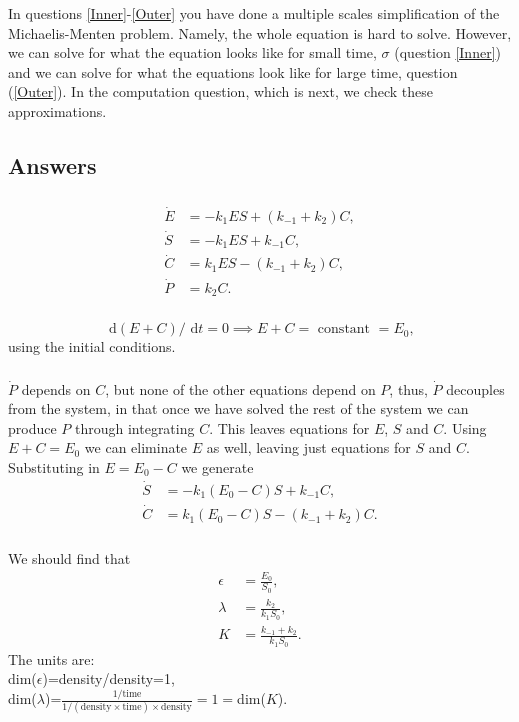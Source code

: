 \documentclass[]{article}
\newcommand{\bb}{\begin{equation}}
\newcommand{\ee}{\end{equation}}
\newcommand{\rd}{\text{ d}}
\renewcommand{\l}{\left(}
\renewcommand{\r}{\right)}
\begin{document}
In questions \ref{Inner}-\ref{Outer} you have done a multiple scales simplification of the Michaelis-Menten problem. Namely, the whole equation is hard to solve. However, we can solve for what the equation looks like for small time, $\sigma$ (question \ref{Inner}) and we can solve for what the equations look like for large time, question (\ref{Outer}). In the computation question, which is next, we check these approximations.

\begin{Answ}
\subsection{Answers}
\subsubsection{}
\begin{align}
\dot{E}&=-k_1ES+\l k_{-1}+k_2\r C,\nonumber\\
\dot{S}&=-k_1ES+k_{-1} C,\nonumber\\
\dot{C}&=k_1ES-\l k_{-1}+k_2\r C,\nonumber\\
\dot{P}&=k_2C\nonumber.
\end{align}
\subsubsection{}
\bb
\rd\l E+C\r/\rd t=0\implies E+C=\textrm{ constant }=E_0,
\ee
using the initial conditions.
\subsubsection{}
$\dot{P}$ depends on $C$, but none of the other equations depend on $P$, thus, $\dot{P}$ decouples from the system, in that once we have solved the rest of the system we can produce $P$ through integrating $C$. This leaves equations for $E$, $S$ and $C$. Using $E+C=E_0$ we can eliminate $E$ as well, leaving just equations for $S$ and $C$. Substituting in $E=E_0-C$ we generate
\begin{align}
\dot{S}&=-k_1(E_0-C)S + k_{-1}C,\\
\dot{C}&=k_1(E_0-C)S -( k_{-1}+k_2)C.
\end{align}
\subsubsection{}
We should find that
\begin{align}
\epsilon&=\frac{E_0}{S_0},\nonumber\\
\lambda&=\frac{k_2}{k_1S_0},\nonumber\\
K&=\frac{k_{-1}+k_2}{k_1S_0}\nonumber.
\end{align}
The units are:\\
dim($\epsilon$)=density/density=1,\\
dim($\lambda$)=$\frac{\textrm{1/time}}{1/(\textrm{density}\times \textrm{time}) \times \textrm{density}}=1=$dim($K$).

\end{Answ}
\end{document}
